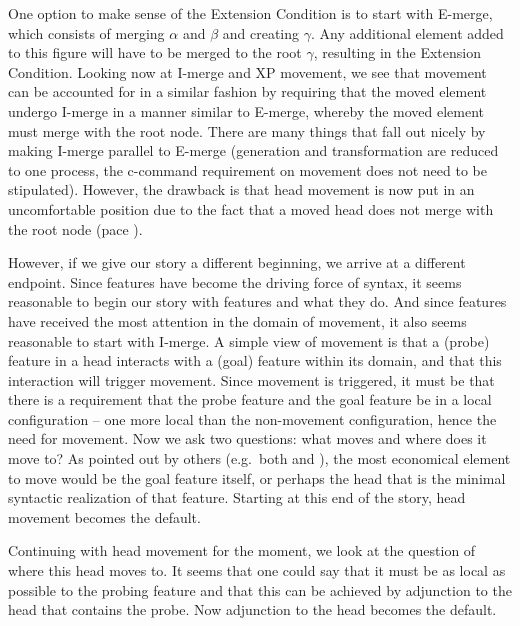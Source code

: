 \documentclass[output=paper,colorlinks,citecolor=brown,
]{langscibook}
\begin{document}
One option to make sense of the Extension Condition is to start with E-merge, which consists of merging $\alpha$ and $\beta$ and creating $\gamma$. Any additional element added to this figure will have to be merged to the root $\gamma$, resulting in the Extension Condition. Looking now at I-merge and XP movement, we see that movement can be accounted for in a similar fashion by requiring that the moved element undergo I-merge in a manner similar to E-merge, whereby the moved element must merge with the root node.  There are many things that fall out nicely by making I-merge parallel to E-merge (generation and transformation are reduced to one process, the c-command requirement on movement does not need to be stipulated).  However, the drawback is that head movement is now put in an uncomfortable position due to the fact that a moved head does not merge with the root node (pace \citealt{Matushansky:2006}).

However, if we give our story a different beginning, we arrive at a different endpoint. Since features have become the driving force of syntax, it seems reasonable to begin our story with features and what they do.  And since  features have received the most attention in the domain of movement, it also seems reasonable to start with I-merge.  A simple view of movement is that a (probe) feature in a head interacts with a (goal) feature within its domain, and that this interaction  will trigger movement.  Since movement is triggered, it must be that there is a requirement that the probe feature and the goal feature be in a local configuration -- one more local than the non-movement configuration, hence the need for movement.  Now we ask two questions: what moves and where does it move to?  As pointed out by others (e.g.\ both \citealt{Cheng:2000b} and \citealt{Donati:2006}), the most economical element to move would be the goal feature itself, or perhaps the head that is the minimal syntactic realization of that feature. Starting at this end of the story, head movement becomes the default.   

Continuing with head movement for the moment, we  look at the question of where this head moves to.  It seems that one could say that it must be as local as possible to the probing feature and that this can be achieved by adjunction to the head that contains the probe.  Now adjunction to the head becomes the default.  
\end{document}
